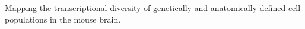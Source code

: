 Mapping the transcriptional diversity of genetically and anatomically defined cell populations in the mouse brain.
